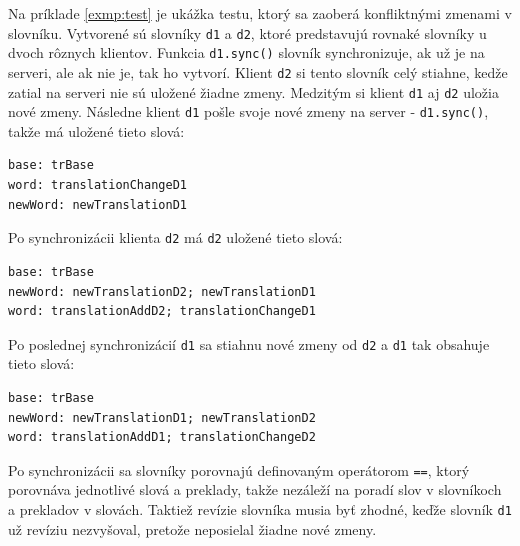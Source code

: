 \documentclass[
  digital, %
  table,   %
  lof,     %
  lot,     %
]{fithesis3}
\begin{document}
Na príklade \ref{exmp:test} je ukážka testu, ktorý sa zaoberá konfliktnými zmenami v slovníku. Vytvorené sú slovníky \texttt{d1} a \texttt{d2}, ktoré predstavujú rovnaké slovníky u dvoch rôznych klientov. Funkcia \texttt{d1.sync()} slovník synchronizuje, ak už je na serveri, ale ak nie je, tak ho vytvorí. Klient \texttt{d2} si tento slovník celý stiahne, kedže zatial na serveri nie sú uložené žiadne zmeny. Medzitým si klient \texttt{d1} aj \texttt{d2} uložia nové zmeny. Následne klient \texttt{d1} pošle svoje nové zmeny na server - \texttt{d1.sync()}, takže má uložené tieto slová:
\begin{lstlisting}[basicstyle=\small]
base: trBase
word: translationChangeD1
newWord: newTranslationD1
\end{lstlisting}

Po synchronizácii klienta \texttt{d2} má \texttt{d2} uložené tieto slová:

\begin{lstlisting}[basicstyle=\small]
base: trBase
newWord: newTranslationD2; newTranslationD1
word: translationAddD2; translationChangeD1
\end{lstlisting}

Po poslednej synchronizácií \texttt{d1} sa stiahnu nové zmeny od \texttt{d2} a \texttt{d1} tak obsahuje tieto slová:

\begin{lstlisting}[basicstyle=\small]
base: trBase
newWord: newTranslationD1; newTranslationD2
word: translationAddD1; translationChangeD2
\end{lstlisting}

Po synchronizácii sa slovníky porovnajú definovaným operátorom \texttt{==}, ktorý porovnáva jednotlivé slová a preklady, takže nezáleží na poradí slov v slovníkoch a prekladov v slovách. Taktiež revízie slovníka musia byť zhodné, keďže slovník \texttt{d1} už revíziu nezvyšoval, pretože neposielal žiadne nové zmeny.
\end{document}
